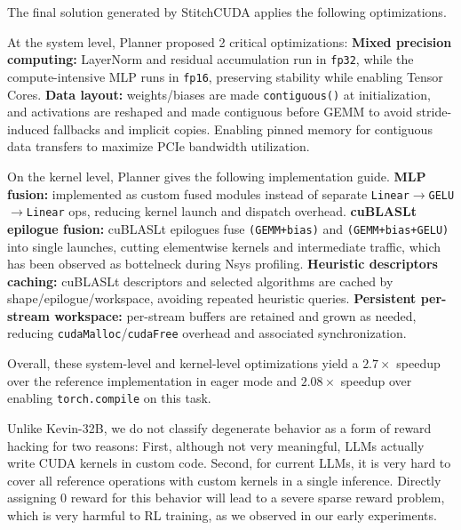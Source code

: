 The final solution generated by StitchCUDA applies the following optimizations.

At the system level, Planner proposed 2 critical optimizations: \textbf{Mixed precision computing:} LayerNorm and residual accumulation run in \texttt{fp32}, while the compute-intensive MLP runs in \texttt{fp16}, preserving stability while enabling Tensor Cores. \textbf{Data layout:} weights/biases are made \texttt{contiguous()} at initialization, and activations are reshaped and made contiguous before GEMM to avoid stride-induced fallbacks and implicit copies. Enabling pinned memory for contiguous data transfers to maximize PCIe bandwidth utilization.

On the kernel level, Planner gives the following implementation guide. \textbf{MLP fusion:} implemented as custom fused modules instead of separate \texttt{Linear}$\rightarrow$\texttt{GELU}$\rightarrow$\texttt{Linear} ops, reducing kernel launch and dispatch overhead. \textbf{cuBLASLt epilogue fusion:} cuBLASLt epilogues fuse \texttt{(GEMM+bias)} and \texttt{(GEMM+bias+GELU)} into single launches, cutting elementwise kernels and intermediate traffic, which has been observed as bottelneck during Nsys profiling. \textbf{Heuristic descriptors caching:} cuBLASLt descriptors and selected algorithms are cached by shape/epilogue/workspace, avoiding repeated heuristic queries. \textbf{Persistent per-stream workspace:} per-stream buffers are retained and grown as needed, reducing \texttt{cudaMalloc}/\texttt{cudaFree} overhead and associated synchronization.

\noindent Overall, these system-level and kernel-level optimizations yield a $2.7\times$ speedup over the reference implementation in eager mode and $2.08\times$ speedup over enabling \texttt{torch.compile} on this task. 

Unlike Kevin-32B, we do not classify degenerate behavior as a form of reward hacking for two reasons: First, although not very meaningful, LLMs actually write CUDA kernels in custom code. Second, for current LLMs, it is very hard to cover all reference operations with custom kernels in a single inference. Directly assigning 0 reward for this behavior will lead to a severe sparse reward problem, which is very harmful to RL training, as we observed in our early experiments. 


